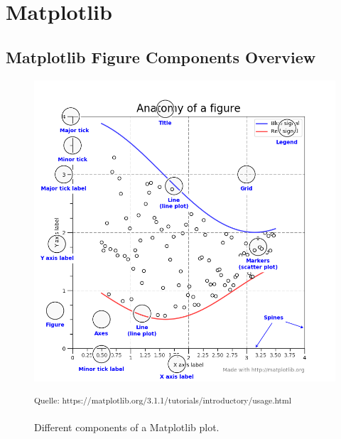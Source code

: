 \clearpage





\section{Matplotlib}
\label{sec:appendix:matplotlib}


\subsection{Matplotlib Figure Components Overview}

\begin{figure}[h]
    \centering
    \includegraphics[width=14cm]{resources/img/MatplotlibContent}
    \caption{Different components of a Matplotlib plot.}
    \small\textsuperscript{Quelle: https://matplotlib.org/3.1.1/tutorials/introductory/usage.html}
    \label{a:fig:matplotlib:content}
\end{figure}

\clearpage

